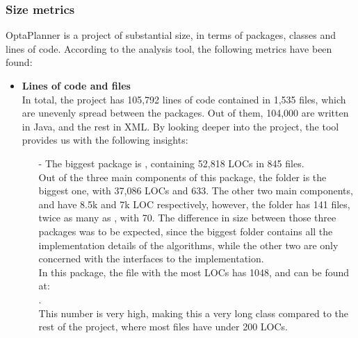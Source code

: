         \subsubsection{Size metrics}
            OptaPlanner is a project of substantial size, in terms of packages, classes and lines of code. According to the analysis tool, the following metrics have been found:
            \begin{itemize}
                \item \textbf{Lines of code and files} \\
                In total, the project has 105,792 lines of code contained in 1,535 files, which are unevenly spread between the packages. Out of them, 104,000 are written in Java, and the rest in XML. By looking deeper into the project, the tool provides us with the following insights:
                    \begin{itemize}
                        \item[-] The biggest package is , containing 52,818 LOCs in 845 files. \\ 
                        Out of the three main components of this package, the  folder is the biggest one, with 37,086 LOCs and 633. The other two main components,  and  have 8.5k and 7k LOC respectively, however, the  folder has 141 files, twice as many as , with 70.
                        The difference in size between those three packages was to be expected, since the biggest folder contains all the implementation details of the algorithms, while the other two are only concerned with the interfaces to the implementation.\\
                        In this package, the file with the most LOCs has 1048, and can be found at: \\ 
                        . \\
                        This number is very high, making this a very long class compared to the rest of the project, where most files have under 200 LOCs.
                        

\end{itemize}
\end{itemize}
